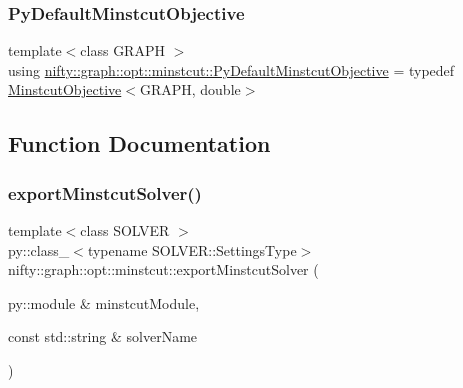 \mbox{\label{namespacenifty_1_1graph_1_1opt_1_1minstcut_a066e5a061f3b821097a733b59298e7fc}} 
\subsubsection{\texorpdfstring{Py\+Default\+Minstcut\+Objective}{PyDefaultMinstcutObjective}}
{\footnotesize\ttfamily template$<$class G\+R\+A\+PH $>$ \\
using \hyperlink{namespacenifty_1_1graph_1_1opt_1_1minstcut_a066e5a061f3b821097a733b59298e7fc}{nifty\+::graph\+::opt\+::minstcut\+::\+Py\+Default\+Minstcut\+Objective} = typedef \hyperlink{classnifty_1_1graph_1_1opt_1_1minstcut_1_1MinstcutObjective}{Minstcut\+Objective}$<$G\+R\+A\+PH, double$>$}



\subsection{Function Documentation}
\mbox{\label{namespacenifty_1_1graph_1_1opt_1_1minstcut_a6aa5581d72ddc42bc38f3482a33c4761}} 
\subsubsection{\texorpdfstring{export\+Minstcut\+Solver()}{exportMinstcutSolver()}}
{\footnotesize\ttfamily template$<$class S\+O\+L\+V\+ER $>$ \\
py\+::class\+\_\+$<$typename S\+O\+L\+V\+E\+R\+::\+Settings\+Type$>$ nifty\+::graph\+::opt\+::minstcut\+::export\+Minstcut\+Solver (\begin{DoxyParamCaption}\item[{py\+::module \&}]{minstcut\+Module,  }\item[{const std\+::string \&}]{solver\+Name }\end{DoxyParamCaption})}

